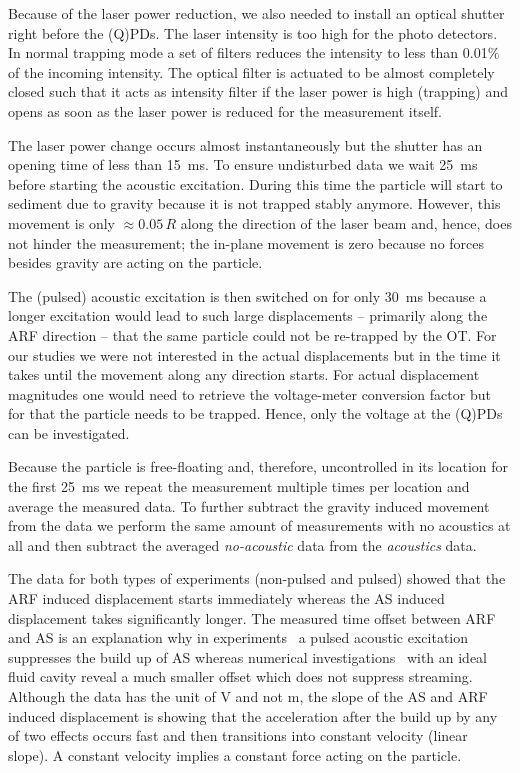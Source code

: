Because of the laser power reduction, we also needed to install an optical 
shutter right before the (Q)PDs. The laser intensity is too high for the photo 
detectors. In normal trapping mode a set of filters reduces the intensity to 
less than 0.01\% of the incoming intensity. The optical filter is actuated to 
be almost completely closed such that it acts as intensity filter if the laser 
power is high (trapping) and opens as soon as the laser power is reduced for 
the measurement itself.

The laser power change occurs almost instantaneously but the shutter has an 
opening time of less than \SI{15}{\ms}. To ensure undisturbed data we wait 
\SI{25}{\ms} before starting the acoustic excitation. During this time the 
particle will start to sediment due to gravity because it is not trapped stably 
anymore. However, this movement is only $\approx 0.05\,R$ along the direction 
of the laser beam and, hence, does not hinder the measurement; the in-plane 
movement is zero because no forces besides gravity are acting on the particle.

The (pulsed) acoustic excitation is then switched on for only \SI{30}{\ms} 
because a longer excitation would lead to such large displacements -- primarily 
along the ARF direction -- that the same particle could not be re-trapped by 
the OT. For our studies we were not interested in the actual displacements but 
in the time it takes until the movement along any direction starts. For actual 
displacement magnitudes one would need to retrieve the voltage-meter conversion 
factor but for that the particle needs to be trapped. Hence, only the voltage 
at the (Q)PDs can be investigated.

Because the particle is free-floating and, therefore, uncontrolled in its 
location for the first \SI{25}{\ms} we repeat the measurement multiple times 
per location and average the measured data. To further subtract the gravity 
induced movement from the data we perform the same amount of measurements with 
no acoustics at all and then subtract the averaged \emph{no-acoustic} data from 
the \emph{acoustics} data.

The data for both types of experiments (non-pulsed and pulsed) showed that the 
ARF induced displacement starts immediately whereas the AS induced displacement 
takes significantly longer. The measured time offset between ARF and AS is an 
explanation why in experiments~\cite{Castro2016,Hoyos2013} a pulsed acoustic 
excitation suppresses the build up of AS whereas numerical 
investigations~\cite{Muller2015} with an ideal fluid cavity reveal a much 
smaller offset which does not suppress streaming. Although the data has the 
unit of \si{\volt} and not \si{\meter}, the slope of the AS and ARF induced 
displacement is showing that the acceleration after the build up by any of two 
effects occurs fast and then transitions into constant velocity (linear slope). 
A constant velocity implies a constant force acting on the particle.

